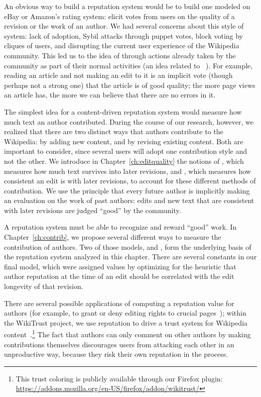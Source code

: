 An obvious way to build a reputation system would be to build one
modeled on eBay or Amazon's rating system: elicit votes from users
on the quality of a revision or the work of an author.
We had several concerns about this style of system: lack of adoption,
Sybil attacks through puppet votes, block voting by cliques of users, and
disrupting the current user experience of the Wikipedia community.
This led us to the idea of  through
actions already taken by the community as part of their normal activities
(an idea related to ~\cite{Samuelson1938}).
For example, reading an article and not making an edit to it is
an implicit vote (though perhaps not a strong one)
that the article is of good quality; the more page views an article
has, the more we can believe that there are no errors in it.


The simplest idea for a content-driven reputation system would measure
how much text an author contributed.
During the course of our research, however, we realized that there are
two distinct ways that authors contribute to the Wikipedia: by adding
new content, and by revising existing content.
Both are important to consider, since several users will
adopt one contribution style and not the other.
We introduce in Chapter~\ref{ch:editquality} the notions of
, which measures how much text survives
into later revisions, and , which measures
how consistent an edit is with later revisions,
to account for these different methods of contribution.
We use the principle that every future author is
implicitly making an evaluation on the work of past authors:
edits and new text that are consistent with later revisions
are judged ``good'' by the community.

A reputation system must be able to recognize and reward
``good'' work.
In Chapter~\ref{ch:contrib}, we propose several different ways
to measure the contribution of authors.
Two of those models, \textlong and \editlong,
form the underlying basis of the reputation system analyzed
in this chapter.
There are several constants in our final model, which were assigned
values by optimizing for the heuristic that author reputation at
the time of an edit
should be correlated with the edit longevity of that revision.

There are several possible applications of computing a reputation
value for authors (for example, to grant or deny editing rights to
crucial pages~\cite{Blaze1996}); within the WikiTrust project,
we use reputation to drive a trust system for
Wikipedia content~\cite{Adler2008b}.\footnote{This trust coloring
is publicly available through our Firefox plugin:
\url{https://addons.mozilla.org/en-US/firefox/addon/wikitrust/}}
The fact that authors can only comment on other authors by
making contributions themselves discourages users from attacking
each other in an unproductive way, because they risk their own reputation in the process.

